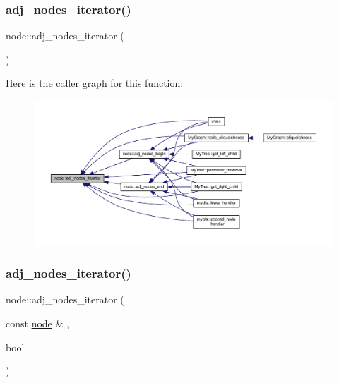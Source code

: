 \subsubsection{\texorpdfstring{adj\+\_\+nodes\+\_\+iterator()}{adj\_nodes\_iterator()}\hspace{0.1cm}{\footnotesize\ttfamily [1/2]}}
{\footnotesize\ttfamily node\+::adj\+\_\+nodes\+\_\+iterator (\begin{DoxyParamCaption}{ }\end{DoxyParamCaption})}

Here is the caller graph for this function\+:\nopagebreak
\begin{figure}[H]
\begin{center}
\leavevmode
\includegraphics[width=350pt]{classnode_a392f19ea6dfa344bdf5c4d5a4b25eb8c_icgraph}
\end{center}
\end{figure}
\mbox{\label{classnode_ade9ca1b2c63a0467be176756545b3c2c}} 
\subsubsection{\texorpdfstring{adj\+\_\+nodes\+\_\+iterator()}{adj\_nodes\_iterator()}\hspace{0.1cm}{\footnotesize\ttfamily [2/2]}}
{\footnotesize\ttfamily node\+::adj\+\_\+nodes\+\_\+iterator (\begin{DoxyParamCaption}\item[{const \mbox{\hyperlink{classnode}{node}} \&}]{,  }\item[{bool}]{ }\end{DoxyParamCaption})}

\mbox{\label{classnode_a1e5e94e426da180a069cf307616e38e3}} 
